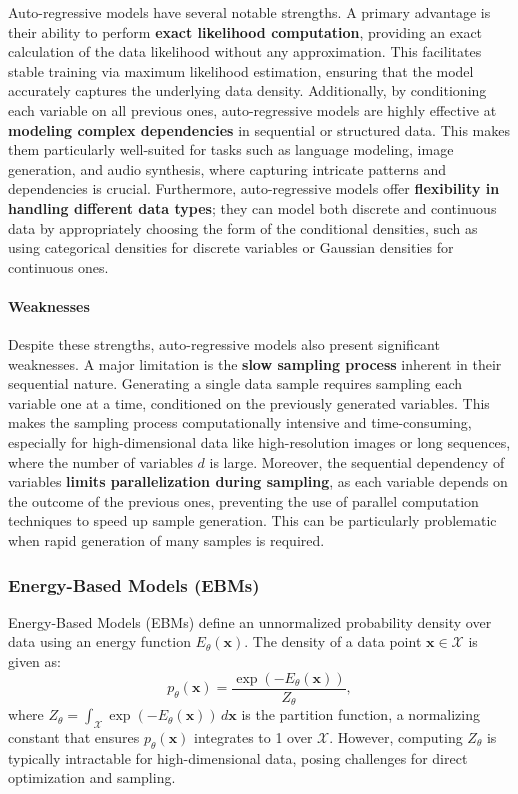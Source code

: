 Auto-regressive models have several notable strengths. A primary advantage is their ability to perform \textbf{exact likelihood computation}, providing an exact calculation of the data likelihood without any approximation. This facilitates stable training via maximum likelihood estimation, ensuring that the model accurately captures the underlying data density. Additionally, by conditioning each variable on all previous ones, auto-regressive models are highly effective at \textbf{modeling complex dependencies} in sequential or structured data. This makes them particularly well-suited for tasks such as language modeling, image generation, and audio synthesis, where capturing intricate patterns and dependencies is crucial. Furthermore, auto-regressive models offer \textbf{flexibility in handling different data types}; they can model both discrete and continuous data by appropriately choosing the form of the conditional densities, such as using categorical densities for discrete variables or Gaussian densities for continuous ones.

\paragraph{Weaknesses}

Despite these strengths, auto-regressive models also present significant weaknesses. A major limitation is the \textbf{slow sampling process} inherent in their sequential nature. Generating a single data sample requires sampling each variable one at a time, conditioned on the previously generated variables. This makes the sampling process computationally intensive and time-consuming, especially for high-dimensional data like high-resolution images or long sequences, where the number of variables \( d \) is large. Moreover, the sequential dependency of variables \textbf{limits parallelization during sampling}, as each variable depends on the outcome of the previous ones, preventing the use of parallel computation techniques to speed up sample generation. This can be particularly problematic when rapid generation of many samples is required.


\subsubsection{Energy-Based Models (EBMs)}\label{sec:energy_based_models}

Energy-Based Models (EBMs) \cite{lecun2006tutorial} define an unnormalized probability density over data using an energy function \( E_\theta(\mathbf{x}) \). The density of a data point \( \mathbf{x} \in \mathcal{X} \) is given as:
\[
p_\theta(\mathbf{x}) = \frac{\exp(-E_\theta(\mathbf{x}))}{Z_\theta},
\]
where \( Z_\theta = \int_{\mathcal{X}} \exp(-E_\theta(\mathbf{x})) \, d\mathbf{x} \) is the partition function, a normalizing constant that ensures \( p_\theta(\mathbf{x}) \) integrates to 1 over \( \mathcal{X} \). However, computing \( Z_\theta \) is typically intractable for high-dimensional data, posing challenges for direct optimization and sampling.

